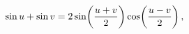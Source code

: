 \[\mathop{\sin\/}\nolimits u+\mathop{\sin\/}\nolimits v=2\mathop{\sin\/}%
\nolimits\!\left(\frac{u+v}{2}\right)\mathop{\cos\/}\nolimits\!\left(\frac{u-v%
}{2}\right),\]